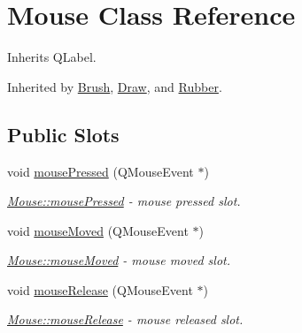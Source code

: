 \hypertarget{class_mouse}{}\section{Mouse Class Reference}
\label{class_mouse}


Inherits Q\+Label.



Inherited by \mbox{\hyperlink{class_brush}{Brush}}, \mbox{\hyperlink{class_draw}{Draw}}, and \mbox{\hyperlink{class_rubber}{Rubber}}.

\subsection*{Public Slots}
\begin{DoxyCompactItemize}
\item 
void \mbox{\hyperlink{class_mouse_a75f0d490d499fd2a2593d42fcd177759}{mouse\+Pressed}} (Q\+Mouse\+Event $\ast$)
\begin{DoxyCompactList}\small\item\em \mbox{\hyperlink{class_mouse_a75f0d490d499fd2a2593d42fcd177759}{Mouse\+::mouse\+Pressed}} -\/ mouse pressed slot. \end{DoxyCompactList}\item 
void \mbox{\hyperlink{class_mouse_ad1906d0601ba2979128c918a1b4e0a6a}{mouse\+Moved}} (Q\+Mouse\+Event $\ast$)
\begin{DoxyCompactList}\small\item\em \mbox{\hyperlink{class_mouse_ad1906d0601ba2979128c918a1b4e0a6a}{Mouse\+::mouse\+Moved}} -\/ mouse moved slot. \end{DoxyCompactList}\item 
void \mbox{\hyperlink{class_mouse_a52cf37734cdd4d34f3929e0828a6f94d}{mouse\+Release}} (Q\+Mouse\+Event $\ast$)
\begin{DoxyCompactList}\small\item\em \mbox{\hyperlink{class_mouse_a52cf37734cdd4d34f3929e0828a6f94d}{Mouse\+::mouse\+Release}} -\/ mouse released slot. \end{DoxyCompactList}\end{DoxyCompactItemize}
